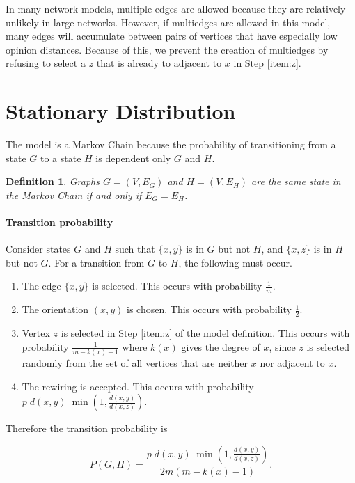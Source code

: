 \documentclass[a4paper,10pt]{article}
\newtheorem{defn}{Definition}
\begin{document}
In many network models, multiple edges are allowed because they are relatively unlikely in large networks. However, if multiedges are allowed in this model, many edges will accumulate between pairs of vertices that have especially low opinion distances. Because of this, we prevent the creation of multiedges by refusing to select a $z$ that is already to adjacent to $x$ in Step \ref{item:z}.

\section{Stationary Distribution}
The model is a Markov Chain because the probability of transitioning from a state $G$ to a state $H$ is dependent only $G$ and $H$. 

\begin{defn}
 Graphs $G = (V, E_G)$ and $H = (V, E_H)$ are the same state in the Markov Chain if and only if $E_G = E_H$.
\end{defn}


\paragraph{Transition probability} Consider states $G$ and $H$ such that $\{x, y\}$ is in $G$ but not $H$, and $\{x, z\}$ is in $H$ but not $G$. For a transition from $G$ to $H$, the following must occur.
\begin{enumerate}
 \item The edge $\{x, y\}$ is selected. This occurs with probability $\frac{1}{m}$.
 \item The orientation $(x, y)$ is chosen. This occurs with probability $\frac{1}{2}$.
 \item Vertex $z$ is selected in Step \ref{item:z} of the model definition. This occurs with probability $\frac{1}{m - k(x) - 1}$ where $k(x)$ gives the degree of $x$, since $z$ is selected randomly from the set of all vertices that are neither $x$ nor adjacent to $x$.
 \item The rewiring is accepted. This occurs with probability $ p \; d(x, y) \; \min(1, \frac{d(x, y)}{d(x, z)}).$
\end{enumerate}
Therefore the transition probability is 

\begin{equation}
\label{eqn:pgh}
 P(G, H) = \frac{ p \; d(x, y) \; \min\left(1, \frac{d(x, y)}{d(x, z)}\right)}{2m \left(m - k(x) - 1\right)}.
\end{equation}
\end{document}
